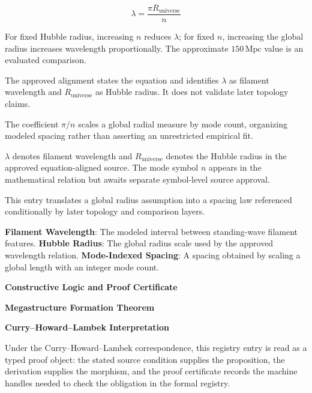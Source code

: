 
\[
\lambda=\frac{\pi R_{\mathrm{universe}}}{n}
\]


For fixed Hubble radius, increasing \(n\) reduces \(\lambda\); for fixed \(n\), increasing the global radius increases wavelength proportionally. The approximate \(150\,\mathrm{Mpc}\) value is an evaluated comparison.


The approved alignment states the equation and identifies \(\lambda\) as filament wavelength and \(R_{\mathrm{universe}}\) as Hubble radius. It does not validate later topology claims.


The coefficient \(\pi/n\) scales a global radial measure by mode count, organizing modeled spacing rather than asserting an unrestricted empirical fit.


\(\lambda\) denotes filament wavelength and \(R_{\mathrm{universe}}\) denotes the Hubble radius in the approved equation-aligned source. The mode symbol \(n\) appears in the mathematical relation but awaits separate symbol-level source approval.


This entry translates a global radius assumption into a spacing law referenced conditionally by later topology and comparison layers.


\noindent \textbf{Filament Wavelength}: The modeled interval between standing-wave filament features. \enspace\textbullet\enspace \textbf{Hubble Radius}: The global radius scale used by the approved wavelength relation. \enspace\textbullet\enspace \textbf{Mode-Indexed Spacing}: A spacing obtained by scaling a global length with an integer mode count.\par

\endgroup

\ifTZPDarkEdition
{}
\fi

\clearpage
\begingroup\tzpsupportsetup
\noindent\textbf{\fontsize{10.8pt}{12.8pt}\selectfont [ID 0137] Constructive Logic and Proof Certificate}\par
\noindent\textbf{\fontsize{10pt}{12pt}\selectfont Megastructure Formation Theorem}\par
\vspace{0.45em}
\begingroup
\footnotesize
\setlength{\parskip}{0.22em}
\setlength{\parindent}{0pt}
\noindent\textbf{Curry--Howard--Lambek Interpretation}\par
Under the Curry--Howard--Lambek correspondence, this registry entry is read as a typed proof
object: the stated source condition supplies the proposition, the derivation supplies the
morphism, and the proof certificate records the machine handles needed to check the obligation
in the formal registry.

